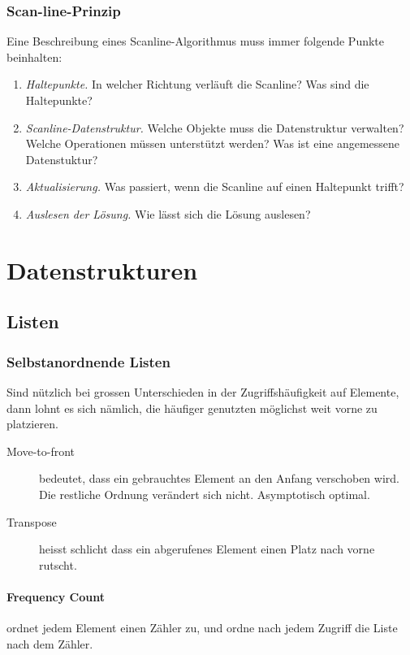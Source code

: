 \documentclass[a4paper, 9pt, DIV=20]{scrartcl}
\begin{document}
\subsubsection{Scan-line-Prinzip}
Eine Beschreibung eines Scanline-Algorithmus muss immer folgende Punkte beinhalten:
\begin{enumerate}
\item \emph{Haltepunkte.} In welcher Richtung verläuft die Scanline? Was sind die Haltepunkte?
\item \emph{Scanline-Datenstruktur.} Welche Objekte muss die Datenstruktur verwalten? Welche Operationen müssen unterstützt werden? Was ist eine angemessene Datenstuktur?
\item \emph{Aktualisierung.} Was passiert, wenn die Scanline auf einen Haltepunkt trifft? 
\item \emph{Auslesen der Lösung.} Wie lässt sich die Lösung auslesen?
\end{enumerate}

\section{Datenstrukturen}
\subsection{Listen}

\subsubsection{Selbstanordnende Listen}
Sind nützlich bei grossen Unterschieden in der Zugriffshäufigkeit auf Elemente, dann lohnt es sich nämlich, die häufiger genutzten möglichst weit vorne zu platzieren.
\begin{description}
\item[Move-to-front] bedeutet, dass ein gebrauchtes Element an den Anfang verschoben wird. Die restliche Ordnung verändert sich nicht. Asymptotisch optimal.
\item[Transpose] heisst schlicht dass ein abgerufenes Element einen Platz nach vorne rutscht.
\end{description}

\paragraph{Frequency Count} ordnet jedem Element einen Zähler zu, und ordne nach jedem Zugriff die Liste nach dem Zähler.
\end{document}
